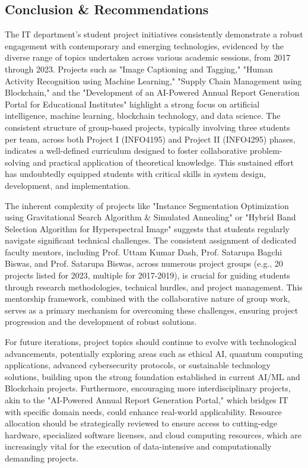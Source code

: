 \documentclass[11pt,a4paper]{article}
\newenvironment{card}{
    \begin{tcolorbox}[
        enhanced,
        colback=cardback,
        colframe=border,
        sharp corners,
        boxrule=0.5pt,
        drop shadow,
        drop shadow={shadow xshift=1mm,shadow yshift=-1mm,fill=border!50},
        boxsep=3mm,
        left=5mm, right=5mm, top=5mm, bottom=5mm,
        width=\textwidth,
        nobeforeafter
    ]
}{\end{tcolorbox}}
\begin{document}
\begin{card}
    \subsection*{\textcolor{accent}{Conclusion \& Recommendations}}
    \vspace{0.3cm}
    The IT department's student project initiatives consistently demonstrate a robust engagement with contemporary and emerging technologies, evidenced by the diverse range of topics undertaken across various academic sessions, from 2017 through 2023. Projects such as "Image Captioning and Tagging," "Human Activity Recognition using Machine Learning," "Supply Chain Management using Blockchain," and the "Development of an AI-Powered Annual Report Generation Portal for Educational Institutes" highlight a strong focus on artificial intelligence, machine learning, blockchain technology, and data science. The consistent structure of group-based projects, typically involving three students per team, across both Project I (INFO4195) and Project II (INFO4295) phases, indicates a well-defined curriculum designed to foster collaborative problem-solving and practical application of theoretical knowledge. This sustained effort has undoubtedly equipped students with critical skills in system design, development, and implementation.

    The inherent complexity of projects like "Instance Segmentation Optimization using Gravitational Search Algorithm \& Simulated Annealing" or "Hybrid Band Selection Algorithm for Hyperspectral Image" suggests that students regularly navigate significant technical challenges. The consistent assignment of dedicated faculty mentors, including Prof. Uttam Kumar Dash, Prof. Satarupa Bagchi Biswas, and Prof. Satarupa Biswas, across numerous project groups (e.g., 20 projects listed for 2023, multiple for 2017-2019), is crucial for guiding students through research methodologies, technical hurdles, and project management. This mentorship framework, combined with the collaborative nature of group work, serves as a primary mechanism for overcoming these challenges, ensuring project progression and the development of robust solutions.

    For future iterations, project topics should continue to evolve with technological advancements, potentially exploring areas such as ethical AI, quantum computing applications, advanced cybersecurity protocols, or sustainable technology solutions, building upon the strong foundation established in current AI/ML and Blockchain projects. Furthermore, encouraging more interdisciplinary projects, akin to the "AI-Powered Annual Report Generation Portal," which bridges IT with specific domain needs, could enhance real-world applicability. Resource allocation should be strategically reviewed to ensure access to cutting-edge hardware, specialized software licenses, and cloud computing resources, which are increasingly vital for the execution of data-intensive and computationally demanding projects.


\end{card}
\end{document}
